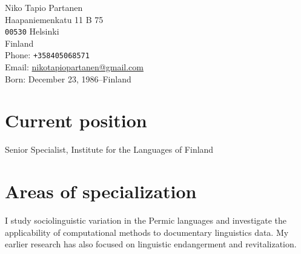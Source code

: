 \documentclass[11pt, a4paper]{article}
\begin{document}

\thispagestyle{empty}


{\LARGE Niko Tapio Partanen}\\[1cm] %
Haapaniemenkatu 11 B 75\\
\texttt{00530} Helsinki\\
Finland\\[.2cm]
Phone: \texttt{+358405068571}\\ %
Email: \href{mailto:nikotapiopartanen@gmail.com}{nikotapiopartanen@gmail.com}\\ %



Born: December 23, 1986–Finland\\ %


\section*{Current position}

Senior Specialist, Institute for the Languages of Finland


\section*{Areas of specialization}

I study sociolinguistic variation in the Permic languages and investigate the applicability of computational methods to documentary linguistics data. My earlier research has also focused on linguistic endangerment and revitalization. 
\end{document}
